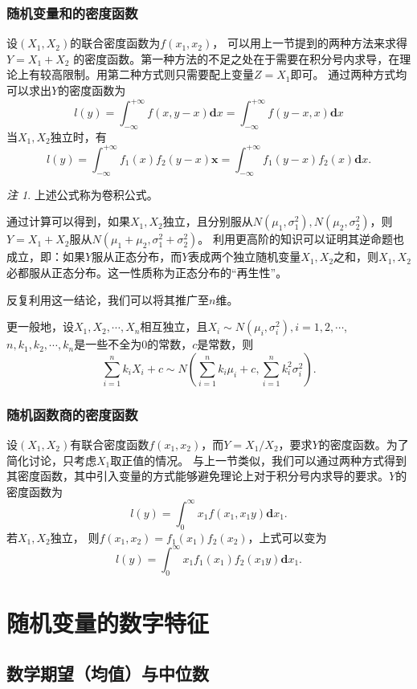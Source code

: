 \documentclass[a4paper,11pt]{article}%
\theoremstyle{remark}
\newtheorem*{remark}{注}
\theoremstyle{remark}
\theoremstyle{definition}
\theoremstyle{definition}
\theoremstyle{plain}
\begin{document}
\subsubsection{随机变量和的密度函数}
设$(X_1,X_2)$的联合密度函数为$f(x_1,x_2)$，
可以用上一节提到的两种方法来求得$Y=X_1+X_2$
的密度函数。第一种方法的不足之处在于需要在积分号内求导，在理论上有较高限制。用第二种方式则只需要配上变量$Z=X_1$即可。
通过两种方式均可以求出$Y$的密度函数为 
\[l(y)=\int_{-\infty}^{+\infty}f(x,y-x)\mathbf{d}x=\int_{-\infty}^{+\infty}f(y-x,x)\mathbf{d}x\]
当$X_1,X_2$独立时，有 
\[l(y)=\int_{-\infty}^{+\infty}f_1(x)f_2(y-x)\mathbf{x}=\int_{-\infty}^{+\infty}f_1(y-x)f_2(x)\mathbf{d}x.\]
\begin{remark}
    上述公式称为卷积公式。
\end{remark}

通过计算可以得到，如果$X_1,X_2$独立，且分别服从$N(\mu_1,\sigma_1^2),N(\mu_2,\sigma_2^2)$，则$Y=X_1+X_2$服从$N(\mu_1+\mu_2,\sigma_1^2+\sigma_2^2)$。
利用更高阶的知识可以证明其逆命题也成立，即：如果$Y$服从正态分布，而$Y$表成两个独立随机变量$X_1,X_2$之和，则$X_1,X_2$必都服从正态分布。这一性质称为正态分布的“再生性”。

反复利用这一结论，我们可以将其推广至$n$维。

更一般地，设$X_1,X_2,\cdots,X_n$相互独立，且$X_i\sim N(\mu_i,\sigma_i^2),i=1,2,\cdots$,\\$n,k_1,k_2,\cdots,k_n$是一些不全为0的常数，$c$是常数，则
\[\sum_{i=1}^{n}k_iX_i+c\sim N(\sum_{i=1}^{n}k_i\mu_i+c,\sum_{i=1}^{n}k_i^2\sigma_i^2).\]
\subsubsection{随机函数商的密度函数}
设$(X_1,X_2)$有联合密度函数$f(x_1,x_2)$，而$Y=X_1/X_2$，要求$Y$的密度函数。为了简化讨论，只考虑$X_1$取正值的情况。
与上一节类似，我们可以通过两种方式得到其密度函数，其中引入变量的方式能够避免理论上对于积分号内求导的要求。$Y$的密度函数为 
\[l(y)=\int_{0}^{\infty}x_1f(x_1,x_1y)\mathbf{d}x_1.\]
若$X_1,X_2$独立， 则$f(x_1,x_2)=f_1(x_1)f_2(x_2)$，上式可以变为 
\[l(y)=\int_{0}^{\infty}x_1f_1(x_1)f_2(x_1y)\mathbf{d}x_1.\]
\section{随机变量的数字特征}
\subsection{数学期望（均值）与中位数}
\end{document}
